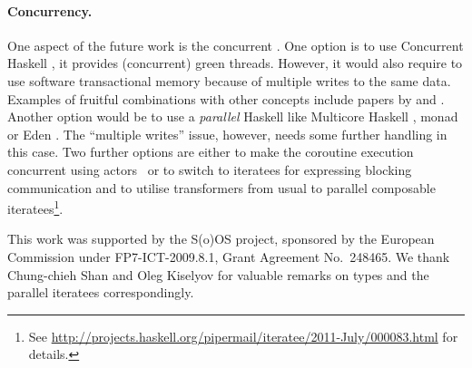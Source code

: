 \paragraph{Concurrency.}
One aspect of the future work is the concurrent \soosim.
One option is to use Concurrent Haskell \cite{ConcHs}, it provides (concurrent) green threads.
However, it would also require to use software transactional memory \cite{springerlink:10.1007/s004460050028} because of multiple writes to the same data.
Examples of fruitful combinations with other concepts include papers by \citeauthor{Harris:2008:CMT:1378704.1378725} \cite{Harris:2008:CMT:1378704.1378725} and \citeauthor{Bieniusa:2010:BAA:1835698.1835714} \cite{Bieniusa:2010:BAA:1835698.1835714,springerlink:10.1007/978-3-642-25959-3_2}.
Another option would be to use a \emph{parallel} Haskell like Multicore Haskell \cite{marlow:rsm},  monad \cite{par-monad} or Eden \cite{eden}.
The ``multiple writes'' issue, however, needs some further handling in this case.
Two further options are either to make the coroutine execution concurrent using actors~\cite{Hewitt:1973:UMA:1624775.1624804,sulzmann2008actors} or to switch to iteratees for expressing blocking communication and to utilise transformers from usual to parallel composable iteratees\footnote{See \url{http://projects.haskell.org/pipermail/iteratee/2011-July/000083.html} for details.}.

%

\acks

This work was supported by the S(o)OS project, sponsored by the European Commission under FP7-ICT-2009.8.1, Grant Agreement No.~248465.
We thank Chung-chieh Shan and Oleg Kiselyov for valuable remarks on
 types and the parallel iteratees correspondingly.


